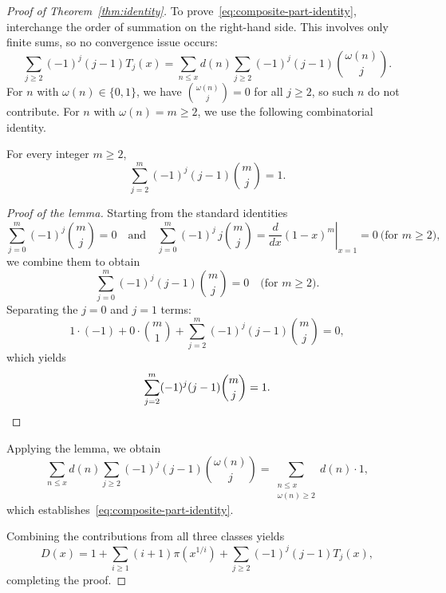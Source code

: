\begin{proof}[Proof of Theorem~\ref{thm:identity}]
To prove~\eqref{eq:composite-part-identity}, interchange the order
of summation on the right-hand side. This involves only finite sums,
so no convergence issue occurs:
\[
    \sum_{j \geq 2} (-1)^j (j-1) T_j(x)
    = \sum_{n \leq x} d(n) \sum_{j \geq 2} (-1)^j (j-1)
      \binom{\omega(n)}{j}.
\]
For $n$ with $\omega(n) \in \{0, 1\}$, we have
$\binom{\omega(n)}{j} = 0$ for all $j \geq 2$, so such $n$ do not
contribute. For $n$ with $\omega(n) = m \geq 2$, we use the
following combinatorial identity.

\begin{lemma}
For every integer $m \geq 2$,
\begin{equation}
    \sum_{j=2}^{m} (-1)^j (j-1) \binom{m}{j} = 1.
\end{equation}
\end{lemma}

\begin{proof}[Proof of the lemma]
Starting from the standard identities
\[
    \sum_{j=0}^{m} (-1)^j \binom{m}{j} = 0
    \quad \text{and} \quad
    \sum_{j=0}^{m} (-1)^j \, j \binom{m}{j} =\left.\frac{d}{dx}(1-x)^m\right|_{x=1}=0 \ \text{(for } m \geq 2),
\]
we combine them to obtain
\[
    \sum_{j=0}^{m} (-1)^j (j-1) \binom{m}{j} = 0
    \quad \text{(for } m \geq 2).
\]
Separating the $j = 0$ and $j = 1$ terms:
\[
    1 \cdot (-1) + 0 \cdot \binom{m}{1}
    + \sum_{j=2}^{m} (-1)^j (j-1) \binom{m}{j} = 0,
\]
which yields
\[
    \sum_{j=2}^{m} (-1)^j (j-1) \binom{m}{j} = 1. \qedhere
\]
\end{proof}

Applying the lemma, we obtain
\[
    \sum_{n \leq x} d(n) \sum_{j \geq 2} (-1)^j (j-1)
    \binom{\omega(n)}{j}
    = \sum_{\substack{n \leq x \\ \omega(n) \geq 2}} d(n) \cdot 1,
\]
which establishes~\eqref{eq:composite-part-identity}.

Combining the contributions from all three classes yields
\[
    D(x) = 1 + \sum_{i \geq 1} (i+1) \pi(x^{1/i})
             + \sum_{j \geq 2} (-1)^j (j-1) T_j(x),
\]
completing the proof.
\end{proof}

